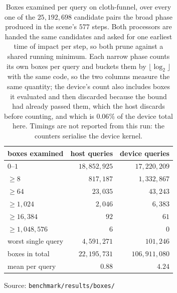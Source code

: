 \begin{table}[htbp]
  \centering
  \caption{Boxes examined per query on cloth-funnel, over every one of the
    $25{,}192{,}698$ candidate pairs the broad phase produced in the
    scene's $577$ steps. Both processors are handed the same
    candidates and asked for one earliest time of impact per step, so both
    prune against a shared running minimum. Each narrow phase counts its own
    boxes per query and buckets them by $\lfloor\log_{2}\rfloor$ with the same
    code, so the two columns measure the same quantity; the device's count also
    includes boxes it evaluated and then discarded because the bound had already
    passed them, which the host discards before counting, and which is
    $0.06\%$ of the device total here. Timings are not reported from this
    run: the counters serialise the device kernel.}
  \label{tab:difficulty}
  \begin{tabular}{lrr}
    \toprule
    boxes examined & host queries & device queries \\
    \midrule
    $0$--$1$                 & $18{,}852{,}925$ & $17{,}220{,}209$ \\
    $\ge 8$                  & $817{,}187$ & $1{,}332{,}867$ \\
    $\ge 64$                 & $23{,}035$ & $43{,}243$ \\
    $\ge 1{,}024$            & $2{,}046$ & $6{,}383$ \\
    $\ge 16{,}384$           & $92$ & $61$ \\
    $\ge 1{,}048{,}576$      & $6$ & $0$ \\
    \midrule
    worst single query       & $4{,}591{,}271$ & $101{,}246$ \\
    \midrule
    boxes in total           & $22{,}195{,}731$ & $106{,}911{,}080$ \\
    mean per query           & $0.88$ & $4.24$ \\
    \bottomrule
  \end{tabular}
  \par\smallskip\footnotesize Source: \texttt{benchmark/results/boxes/}
\end{table}
